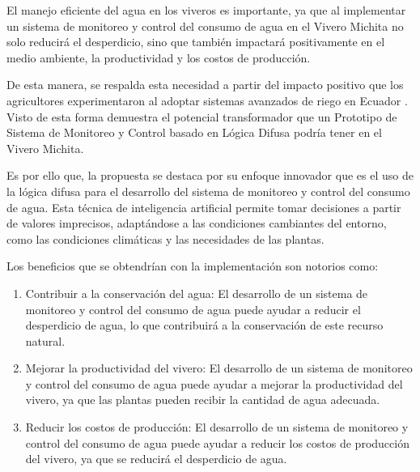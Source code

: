 El manejo eficiente del agua en los viveros es importante, ya que al implementar un sistema de monitoreo y control del consumo de agua en el Vivero Michita no solo reducirá el desperdicio, sino que también impactará positivamente en el medio ambiente, la productividad y los costos de producción.

\bigbreak
De esta manera, se respalda esta necesidad a partir del impacto positivo que los agricultores experimentaron al adoptar sistemas avanzados de riego en Ecuador \cite{riego_tecnificado}. Visto de esta forma demuestra el potencial transformador que un Prototipo de Sistema de Monitoreo y Control basado en Lógica Difusa podría tener en el Vivero Michita.

\bigbreak
Es por ello que, la propuesta se destaca por su enfoque innovador que es el uso de la lógica difusa para el desarrollo del sistema de monitoreo y control del consumo de agua. Esta técnica de inteligencia artificial permite tomar decisiones a partir de valores imprecisos, adaptándose a las condiciones cambiantes del entorno, como las condiciones climáticas y las necesidades de las plantas.

\bigbreak
Los beneficios que se obtendrían con la implementación son notorios como:

\begin{enumerate}
    \item Contribuir a la conservación del agua: El desarrollo de un sistema de monitoreo y control del consumo de agua puede ayudar a reducir el desperdicio de agua, lo que contribuirá a la conservación de este recurso natural.
    \item Mejorar la productividad del vivero: El desarrollo de un sistema de monitoreo y control del consumo de agua puede ayudar a mejorar la productividad del vivero, ya que las plantas pueden recibir la cantidad de agua adecuada.
    \item Reducir los costos de producción: El desarrollo de un sistema de monitoreo y control del consumo de agua puede ayudar a reducir los costos de producción del vivero, ya que se reducirá el desperdicio de agua.
\end{enumerate}
